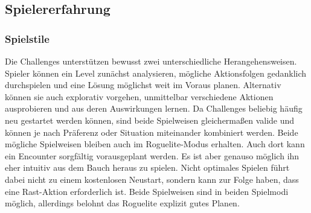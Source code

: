 \subsection{Spielererfahrung}

\subsubsection{Spielstile}
Die Challenges unterstützen bewusst zwei unterschiedliche Herangehensweisen.
Spieler können ein Level zunächst analysieren, mögliche Aktionsfolgen gedanklich durchspielen und eine Lösung möglichst weit im Voraus planen.
Alternativ können sie auch explorativ vorgehen, unmittelbar verschiedene Aktionen ausprobieren und aus deren Auswirkungen lernen.
Da Challenges beliebig häufig neu gestartet werden können, sind beide Spielweisen gleichermaßen valide und können je nach Präferenz oder Situation miteinander kombiniert werden.
Beide mögliche Spielweisen bleiben auch im Roguelite-Modus erhalten.
Auch dort kann ein Encounter sorgfältig vorausgeplant werden.
Es ist aber genauso möglich ihn eher intuitiv aus dem Bauch heraus zu spielen.
Nicht optimales Spielen führt dabei nicht zu einem kostenlosen Neustart, sondern kann zur Folge haben, dass eine Rast-Aktion erforderlich ist.
Beide Spielweisen sind in beiden Spielmodi möglich, allerdings belohnt das Roguelite explizit gutes Planen.

